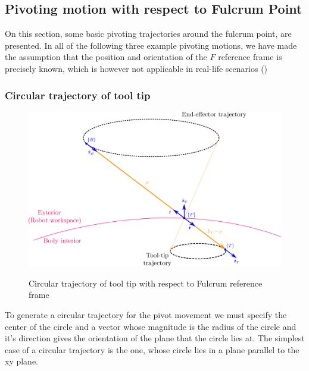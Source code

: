 \subsection{Pivoting motion with respect to Fulcrum Point}
\label{subsection:pivot-motions}

On this section, some basic pivoting trajectories around the fulcrum point, are presented. In all of the following three example pivoting motions, we have made 
the assumption that the position and orientation of the ${F}$ reference frame is precisely known, which is however not applicable in real-life scenarios ()

\subsubsection{Circular trajectory of tool tip}

\begin{center}
\begin{figure}[H]
\centering
\includegraphics[width=12cm]{images/circular-trajectory-wrt-fulcrum.png}\\
\caption{Circular trajectory of tool tip with respect to Fulcrum reference frame}
\end{figure}
\end{center}

To generate a circular trajectory for the pivot movement we must specify the center of the circle 
and a vector whose magnitude is the radius of the circle and it’s direction gives the orientation 
of the plane that the circle lies at. The simplest case of a circular trajectory is the one, 
whose circle lies in a plane parallel to the xy plane.


